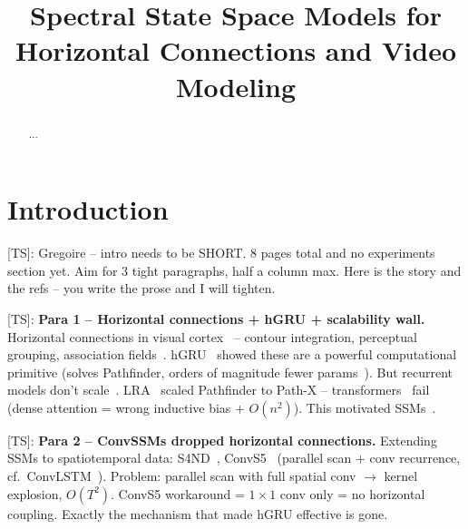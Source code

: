 \documentclass{article}
\title{Spectral State Space Models for Horizontal Connections and Video Modeling}
\author{}
\newcommand{\TS}[1]{{\color{pink}[TS]: #1}}
\begin{document}
\doparttoc %
\faketableofcontents %

\maketitle

\begin{abstract}
...
\end{abstract}

\section{Introduction}

\TS{Gregoire -- intro needs to be SHORT. 8 pages total and no experiments section yet. Aim for 3 tight paragraphs, half a column max. Here is the story and the refs -- you write the prose and I will tighten.}

\TS{%
\textbf{Para 1 -- Horizontal connections + hGRU + scalability wall.}
Horizontal connections in visual cortex~\citep{gilbert1989,bosking1997,stettler2002} -- contour integration, perceptual grouping, association fields~\citep{field1993,gilbertli2013}. hGRU~\citep{linsley2018} showed these are a powerful computational primitive (solves Pathfinder, orders of magnitude fewer params~\citep{linsley2018,kim2019}). But recurrent models don't scale~\citep{linsley2020}. LRA~\citep{tay2021} scaled Pathfinder to Path-X -- transformers~\citep{vaswani2017} fail (dense attention = wrong inductive bias + $O(n^2)$). This motivated SSMs~\citep{gu2022,gu2022s4d,smith2023s5,gu2023,dao2024}.}

\TS{%
\textbf{Para 2 -- ConvSSMs dropped horizontal connections.}
Extending SSMs to spatiotemporal data: S4ND~\citep{nguyen2022}, ConvS5~\citep{smith2023convs5} (parallel scan + conv recurrence, cf.\ ConvLSTM~\citep{shi2015}). Problem: parallel scan with full spatial conv $\to$ kernel explosion, $O(T^2)$. ConvS5 workaround = $1\times 1$ conv only = no horizontal coupling. Exactly the mechanism that made hGRU effective is gone.}
\end{document}
